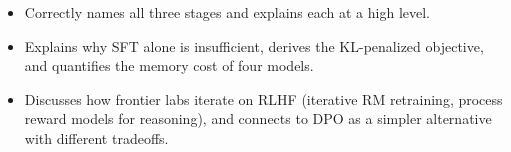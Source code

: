 \begin{interviewq}
\goodgreat
\begin{itemize}
    \item {} Correctly names all three stages and explains each at a high level.
    \item {} Explains why SFT alone is insufficient, derives the KL-penalized objective, and quantifies the memory cost of four models.
    \item {} Discusses how frontier labs iterate on RLHF (iterative RM retraining, process reward models for reasoning), and connects to DPO as a simpler alternative with different tradeoffs.
\end{itemize}

\end{interviewq}


